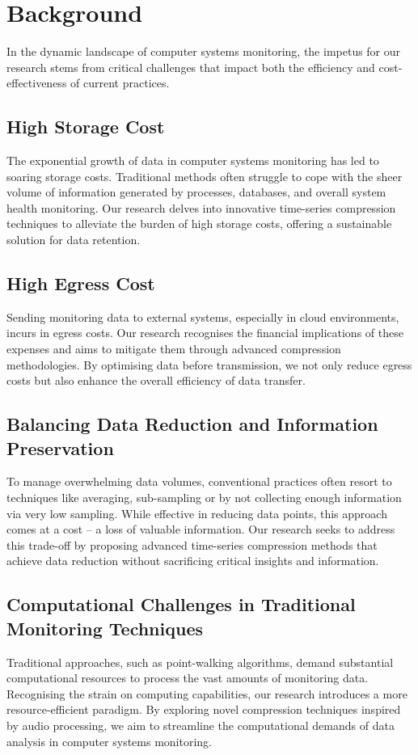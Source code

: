 \documentclass[conference]{IEEEtran}
\begin{document}
\section{Background}

In the dynamic landscape of computer systems monitoring, the impetus for our research stems from critical challenges that impact both the efficiency and cost-effectiveness of current practices. 

\subsection{High Storage Cost}

The exponential growth of data in computer systems monitoring has led to soaring storage costs. Traditional methods often struggle to cope with the sheer volume of information generated by processes, databases, and overall system health monitoring. Our research delves into innovative time-series compression techniques to alleviate the burden of high storage costs, offering a sustainable solution for data retention. 

\subsection{High Egress Cost}
Sending monitoring data to external systems, especially in cloud environments, incurs in egress costs. Our research recognises the financial implications of these expenses and aims to mitigate them through advanced compression methodologies. By optimising data before transmission, we not only reduce egress costs but also enhance the overall efficiency of data transfer. 

\subsection{Balancing Data Reduction and Information Preservation}
To manage overwhelming data volumes, conventional practices often resort to techniques like averaging, sub-sampling or by not collecting enough information via very low sampling. While effective in reducing data points, this approach comes at a cost – a loss of valuable information. Our research seeks to address this trade-off by proposing advanced time-series compression methods that achieve data reduction without sacrificing critical insights and information. 

\subsection{Computational Challenges in Traditional Monitoring Techniques}
Traditional approaches, such as point-walking algorithms, demand substantial computational resources to process the vast amounts of monitoring data. Recognising the strain on computing capabilities, our research introduces a more resource-efficient paradigm. By exploring novel compression techniques inspired by audio processing, we aim to streamline the computational demands of data analysis in computer systems monitoring. 
\end{document}
